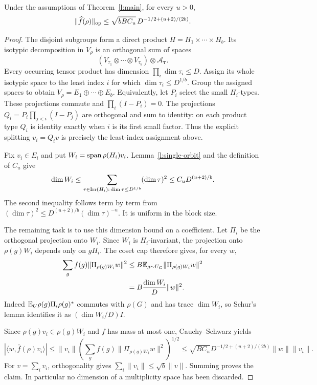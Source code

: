 \begin{proposition}\label{l:orbit-span}
Under the assumptions of Theorem~\ref{l:main}, for every $u>0$,
\[
 \|\widehat f(\rho)\|_{\mathrm{op}}\le\sqrt{bBC_u}\,D^{-1/2+(u+2)/(2b)}.
\]
\end{proposition}
\begin{proof}
The disjoint subgroups form a direct product $H=H_1\times\cdots\times H_b$. Its isotypic decomposition in $V_\rho$ is an orthogonal sum of spaces
\[
 (V_{\tau_1}\otimes\cdots\otimes V_{\tau_b})\otimes\mathcal A_{\boldsymbol\tau}.
\]
Every occurring tensor product has dimension $\prod_i\dim\tau_i\le D$. Assign its whole isotypic space to the least index $i$ for which $\dim\tau_i\le D^{1/b}$. Group the assigned spaces to obtain $V_\rho=E_1\oplus\cdots\oplus E_b$. Equivalently, let $P_i$ select the small $H_i$-types. These projections commute and $\prod_i(I-P_i)=0$. The projections $Q_i=P_i\prod_{j<i}(I-P_j)$ are orthogonal and sum to identity: on each product type $Q_i$ is identity exactly when $i$ is its first small factor. Thus the explicit splitting $v_i=Q_iv$ is precisely the least-index assignment above.

Fix $v_i\in E_i$ and put $W_i=\operatorname{span}\rho(H_i)v_i$. Lemma~\ref{l:single-orbit} and the definition of $C_u$ give
\begin{equation}\label{l:orbit-dimension}
 \dim W_i\le\sum_{\tau\in\operatorname{Irr}(H_i):\,\dim\tau\le D^{1/b}}(\dim\tau)^2
 \le C_uD^{(u+2)/b}.
\end{equation}
The second inequality follows term by term from $(\dim\tau)^2\le D^{(u+2)/b}(\dim\tau)^{-u}$. It is uniform in the block size.

The remaining task is to use this dimension bound on a coefficient. Let $\Pi_i$ be the orthogonal projection onto $W_i$. Since $W_i$ is $H_i$-invariant, the projection onto $\rho(g)W_i$ depends only on $gH_i$. The coset cap therefore gives, for every $w$,
\begin{align*}
 \sum_g f(g)\|\Pi_{\rho(g)W_i}w\|^2
 &\le B\mathbb E_{g\sim U_G}\|\Pi_{\rho(g)W_i}w\|^2\\
 &=B\frac{\dim W_i}{D}\|w\|^2.
\end{align*}
Indeed $\mathbb E_U\rho(g)\Pi_i\rho(g)^*$ commutes with $\rho(G)$ and has trace $\dim W_i$, so Schur's lemma identifies it as $(\dim W_i/D)I$.

Since $\rho(g)v_i\in\rho(g)W_i$ and $f$ has mass at most one, Cauchy--Schwarz yields
\[
 |\langle w,\widehat f(\rho)v_i\rangle|
 \le\|v_i\|\left(\sum_gf(g)\|\Pi_{\rho(g)W_i}w\|^2\right)^{1/2}
 \le\sqrt{BC_u}D^{-1/2+(u+2)/(2b)}\|w\|\|v_i\|.
\]
For $v=\sum_i v_i$, orthogonality gives $\sum_i\|v_i\|\le\sqrt b\|v\|$. Summing proves the claim. In particular no dimension of a multiplicity space has been discarded.
\end{proof}

